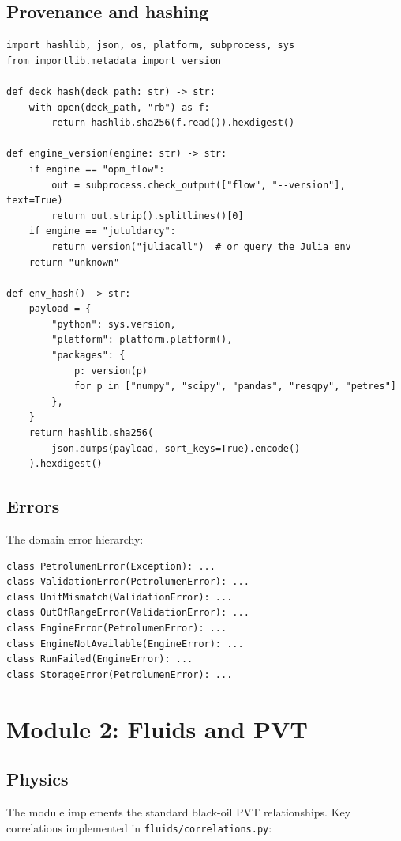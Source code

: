 \documentclass[11pt,a4paper]{article}
\newcommand{\code}[1]{\texttt{#1}}
\begin{document}
\subsection{Provenance and hashing}

\begin{lstlisting}[caption={Environment and deck hashing.}]
import hashlib, json, os, platform, subprocess, sys
from importlib.metadata import version

def deck_hash(deck_path: str) -> str:
    with open(deck_path, "rb") as f:
        return hashlib.sha256(f.read()).hexdigest()

def engine_version(engine: str) -> str:
    if engine == "opm_flow":
        out = subprocess.check_output(["flow", "--version"], text=True)
        return out.strip().splitlines()[0]
    if engine == "jutuldarcy":
        return version("juliacall")  # or query the Julia env
    return "unknown"

def env_hash() -> str:
    payload = {
        "python": sys.version,
        "platform": platform.platform(),
        "packages": {
            p: version(p)
            for p in ["numpy", "scipy", "pandas", "resqpy", "petres"]
        },
    }
    return hashlib.sha256(
        json.dumps(payload, sort_keys=True).encode()
    ).hexdigest()
\end{lstlisting}

\subsection{Errors}
The domain error hierarchy:
\begin{lstlisting}[caption={Domain exceptions.}]
class PetrolumenError(Exception): ...
class ValidationError(PetrolumenError): ...
class UnitMismatch(ValidationError): ...
class OutOfRangeError(ValidationError): ...
class EngineError(PetrolumenError): ...
class EngineNotAvailable(EngineError): ...
class RunFailed(EngineError): ...
class StorageError(PetrolumenError): ...
\end{lstlisting}

\section{Module 2: Fluids and PVT}

\subsection{Physics}
The module implements the standard black-oil PVT relationships. Key
correlations implemented in \code{fluids/correlations.py}:
\end{document}
